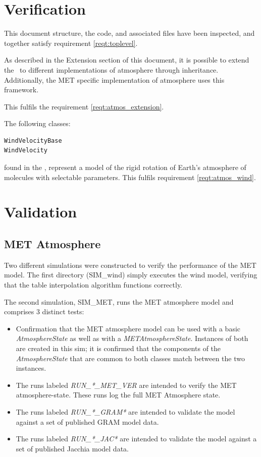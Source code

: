 \section{Verification}
\label{inspect:TLI}
 This document structure, the code, and associated files have been inspected, and together satisfy requirement \ref{reqt:toplevel}.

\label{inspect:extension}
As described in the Extension section of this document, it is possible
to extend the \atmosphereDesc\ to different implementations of atmosphere
through inheritance. Additionally, the MET specific implementation of atmosphere
uses this framework.

This fulfils the requirement \ref{reqt:atmos_extension}.

\label{inspect:wind}
The following classes:

\begin{verbatim}
WindVelocityBase
WindVelocity
\end{verbatim}

found in the \atmosphereDesc, represent a model of the rigid
rotation of Earth's atmosphere of molecules with selectable parameters.
This fulfils requirement \ref{reqt:atmos_wind}.

\section{Validation}

\subsection{MET Atmosphere}

Two different simulations were constructed to verify the performance of the
MET model.  The first directory (SIM\_wind) simply executes the wind model,
verifying that the table interpolation algorithm functions correctly.

The second simulation, SIM\_MET, runs the MET atmosphere model and comprises 3
distinct tests:
\begin{itemize}
\item Confirmation that the MET atmosphere model can be used with a basic
\textit{AtmosphereState} as well as with a \textit{METAtmosphereState}.
Instances of both are created in this sim; it is confirmed that the components
of the \textit{AtmosphereState} that are common to both classes match
between the two instances.
\item The runs labeled \textit{RUN\_*\_MET\_VER} are intended to verify the MET
atmosphere-state.  These runs log the full MET Atmosphere state.
\item The runs labeled \textit{RUN\_*\_GRAM*} are intended to validate the model
against a set of published GRAM model data.
\item The runs labeled \textit{RUN\_*\_JAC*} are intended to validate the model
against a set of published Jacchia model data.
\end{itemize}

